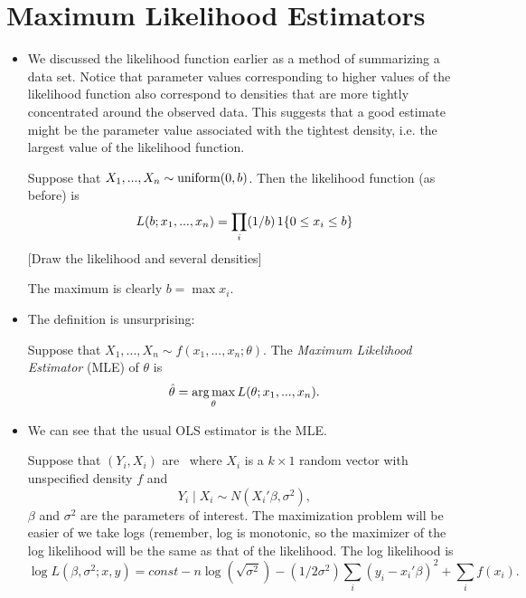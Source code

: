 \section{Maximum Likelihood Estimators}

\begin{itemize}

\item We discussed the likelihood function earlier as a method of
  summarizing a data set.  Notice that parameter values corresponding
  to higher values of the likelihood function also correspond to
  densities that are more tightly concentrated around the observed
  data.  This suggests that a good estimate might be the parameter
  value associated with the tightest density, i.e. the largest value
  of the likelihood function.

  \begin{ex} Suppose that $X_1,...,X_n \sim \operatorname{uniform}(0, b)$.  Then the
    likelihood function (as before) is
    \begin{equation*}
      L(b; x_1,...,x_n) = \prod_i (1/b) \operatorname{1}\{0 \leq x_i \leq b\}
    \end{equation*}
    [Draw the likelihood and several densities]

    The maximum is clearly $b = \max x_i$.
  \end{ex}

\item The definition is unsurprising:
  \begin{defn}
    Suppose that $X_1,...,X_n \sim f(x_1,...,x_n; \theta)$.  The \emph{Maximum
      Likelihood Estimator} (MLE) of $\theta$ is
    \begin{equation*}
      \hat{\theta} = \operatorname*{arg\,max}_\theta L(\theta; x_1,...,x_n).
    \end{equation*}
  \end{defn}

\item We can see that the usual OLS estimator is the MLE.
  \begin{ex} Suppose that $(Y_i,X_i)$ are \iid\ where $X_i$ is a $k \times
    1$ random vector with unspecified density $f$ and
    \begin{equation*}
      Y_i \mid X_i \sim N(X_i'\beta, \sigma^2),
    \end{equation*}
    $\beta$ and $\sigma^2$ are the parameters of interest.  The maximization
    problem will be easier of we take logs (remember, log is
    monotonic, so the maximizer of the log likelihood will be the same
    as that of the likelihood.  The log likelihood is
    \begin{equation*}
      \log L(\beta,\sigma^2; x, y) = const - n\log (\sqrt{\sigma^2}) -
      (1/2\sigma^2) \sum_i (y_i - x_i'\beta)^2 + \sum_i f(x_i).
    \end{equation*}
    

\end{ex}
\end{itemize}
